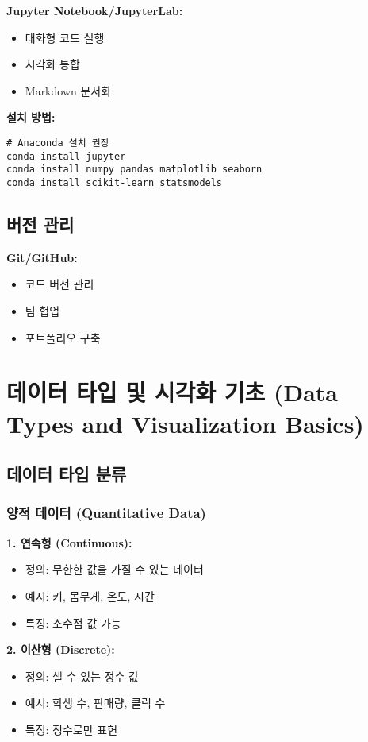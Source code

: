 \documentclass[12pt,a4paper]{article}
\begin{document}
\textbf{Jupyter Notebook/JupyterLab:}
\begin{itemize}
    \item 대화형 코드 실행
    \item 시각화 통합
    \item Markdown 문서화
\end{itemize}

\textbf{설치 방법:}
\begin{verbatim}
# Anaconda 설치 권장
conda install jupyter
conda install numpy pandas matplotlib seaborn
conda install scikit-learn statsmodels
\end{verbatim}

\subsection{버전 관리}

\textbf{Git/GitHub:}
\begin{itemize}
    \item 코드 버전 관리
    \item 팀 협업
    \item 포트폴리오 구축
\end{itemize}

\section{데이터 타입 및 시각화 기초 (Data Types and Visualization Basics)}

\subsection{데이터 타입 분류}

\subsubsection{양적 데이터 (Quantitative Data)}

\textbf{1. 연속형 (Continuous):}
\begin{itemize}
    \item 정의: 무한한 값을 가질 수 있는 데이터
    \item 예시: 키, 몸무게, 온도, 시간
    \item 특징: 소수점 값 가능
\end{itemize}

\textbf{2. 이산형 (Discrete):}
\begin{itemize}
    \item 정의: 셀 수 있는 정수 값
    \item 예시: 학생 수, 판매량, 클릭 수
    \item 특징: 정수로만 표현
\end{itemize}
\end{document}
